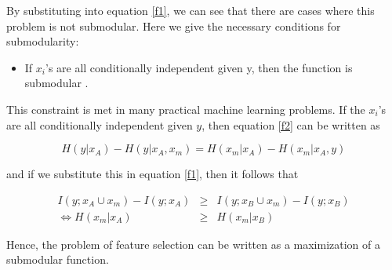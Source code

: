 By substituting into equation \ref{f1}, we can see that there are cases where this problem is not submodular. Here we give the necessary conditions for submodularity:

\begin{itemize}
\item {\bf \lemma} If $x_i$'s are all conditionally independent given y, then the function is submodular \cite{krausefeature}.
\end{itemize}

This constraint is met in many practical machine learning problems. If the $x_i$'s are all conditionally independent given $y$, then equation \ref{f2} can be written as

\begin{equation*}
H(y|x_A)-H(y|x_A,x_m)=H(x_m|x_A)-H(x_m|x_A,y)
\end{equation*}

and if we substitute this in equation \ref{f1}, then it follows that 

\begin{eqnarray*}
I(y;x_A \cup x_m) - I(y;x_A) &\geq & I(y;x_B \cup x_m) - I(y;x_B) \nonumber \\
\Leftrightarrow H(x_m|x_A) &\geq & H(x_m|x_B)
\end{eqnarray*} 

Hence, the problem of feature selection can be written as a maximization of a submodular function.\cite{jie}
